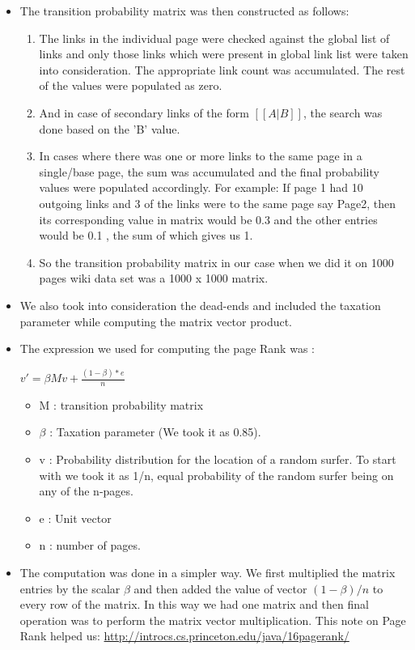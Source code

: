 \documentclass[11pt]{article}
\begin{document}
\begin{itemize}
\item The transition probability matrix was then constructed as follows:
\begin{enumerate}
	\item The links in the individual page were checked against the global list of links and only those links which were present in global link list were taken into consideration. The appropriate link count was accumulated. The rest of the values were populated as zero.
	
	\item And in case of secondary links of the form $[[A | B]]$, the search was done based on the 'B' value.
	
	\item In cases where there was one or more links to the same page in a single/base page, the sum was accumulated and the final probability values were populated accordingly. For example: If page 1 had 10 outgoing links and 3 of the links were to the same page say Page2, then its corresponding value in matrix would be 0.3 and the other entries would be 0.1 , the sum of which gives us 1.
	
	\item So the transition probability matrix in our case when we did it on 1000 pages wiki data set was a 1000 x 1000 matrix.
\end{enumerate}

\item We also took into consideration the dead-ends and included the taxation parameter while computing the matrix vector product.

\item The expression we used for computing the page Rank was :
\begin{center} $\boxed{v' = \beta M v + \frac{(1- \beta) * e}{n} }$ \end{center}
\begin{itemize}
	\item M : transition probability matrix 
	\item $\beta$ : Taxation parameter (We took it as 0.85).
	\item v : Probability distribution for the location of a random surfer. To start with we took it as 1/n, equal probability of the random surfer being on any of the n-pages.
	\item e : Unit vector
	\item n : number of pages.
\end{itemize} 

\item The computation was done in a simpler way. We first multiplied the matrix entries by the scalar $\beta$ and then added the value of vector $(1- \beta) /n$ to every row of the matrix. In this way we had one matrix and then final operation was to perform the matrix vector multiplication. This note on Page Rank helped us:  \url{http://introcs.cs.princeton.edu/java/16pagerank/}


\end{itemize}
\end{document}
